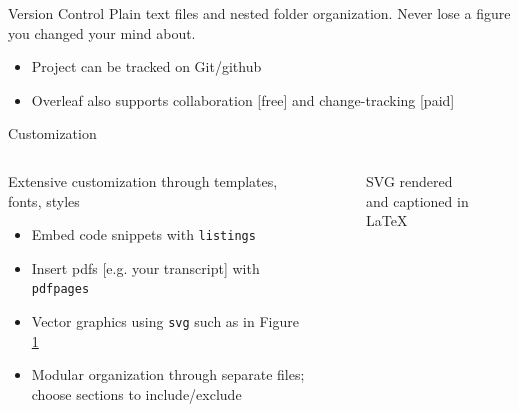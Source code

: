 \documentclass{beamer}
\begin{document}
\begin{frame}{Version Control}
   Plain text files and nested folder organization. Never lose a figure you changed your mind about.\\
   \vspace{0.2in}
    
    \begin{example}
    \begin{itemize}
        \item Project can be tracked on Git/github
        \item Overleaf also supports collaboration [free] and change-tracking [paid]
    \end{itemize}
    \end{example}
\end{frame}

\begin{frame}{Customization}
\begin{columns}
    \begin{column}{0.5\textwidth}
     Extensive customization through templates, fonts, styles
        \begin{example}
        \begin{itemize}
            \item Embed code snippets with \lstinline{listings}
            \item Insert pdfs [e.g. your transcript] with \lstinline{pdfpages}
            \item Vector graphics using \lstinline{svg} such as in Figure \ref{fig: svg}
            \item Modular organization through separate files; choose sections to include/exclude
        \end{itemize}
        \end{example}
    \end{column}
    \begin{column}{0.5\textwidth}
    \begin{figure}
        \centering
        
        \caption{SVG rendered and captioned in LaTeX}
        \label{fig: svg}
    \end{figure}
    \end{column}
   
    \end{columns}
    
\end{frame}

%             
%             
\end{document}
